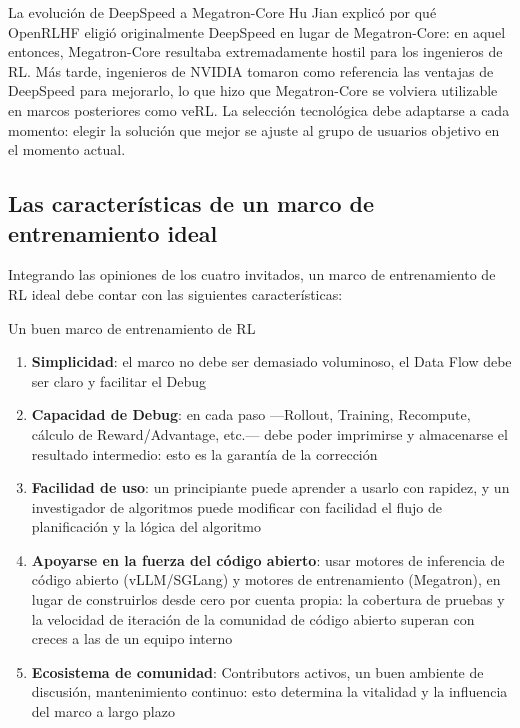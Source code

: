 \begin{knowledgebox}{La evolución de DeepSpeed a Megatron-Core}
Hu Jian explicó por qué OpenRLHF eligió originalmente DeepSpeed en lugar de Megatron-Core: en aquel entonces, Megatron-Core resultaba extremadamente hostil para los ingenieros de RL. Más tarde, ingenieros de NVIDIA tomaron como referencia las ventajas de DeepSpeed para mejorarlo, lo que hizo que Megatron-Core se volviera utilizable en marcos posteriores como veRL. La selección tecnológica debe adaptarse a cada momento: elegir la solución que mejor se ajuste al grupo de usuarios objetivo en el momento actual.
\end{knowledgebox}

\subsection{Las características de un marco de entrenamiento ideal}

Integrando las opiniones de los cuatro invitados, un marco de entrenamiento de RL ideal debe contar con las siguientes características:

\begin{importantbox}{Un buen marco de entrenamiento de RL}
\begin{enumerate}
    \item \textbf{Simplicidad}: el marco no debe ser demasiado voluminoso, el Data Flow debe ser claro y facilitar el Debug
    \item \textbf{Capacidad de Debug}: en cada paso —Rollout, Training, Recompute, cálculo de Reward/Advantage, etc.— debe poder imprimirse y almacenarse el resultado intermedio: esto es la garantía de la corrección
    \item \textbf{Facilidad de uso}: un principiante puede aprender a usarlo con rapidez, y un investigador de algoritmos puede modificar con facilidad el flujo de planificación y la lógica del algoritmo
    \item \textbf{Apoyarse en la fuerza del código abierto}: usar motores de inferencia de código abierto (vLLM/SGLang) y motores de entrenamiento (Megatron), en lugar de construirlos desde cero por cuenta propia: la cobertura de pruebas y la velocidad de iteración de la comunidad de código abierto superan con creces a las de un equipo interno
    \item \textbf{Ecosistema de comunidad}: Contributors activos, un buen ambiente de discusión, mantenimiento continuo: esto determina la vitalidad y la influencia del marco a largo plazo
\end{enumerate}
\end{importantbox}

